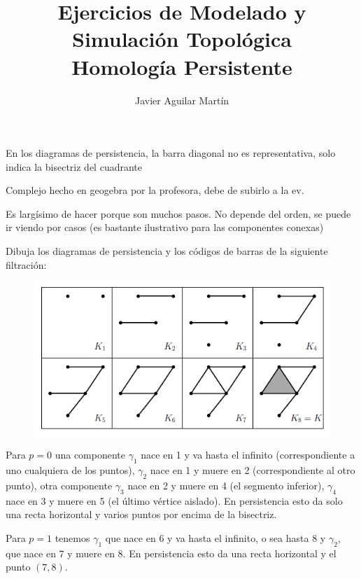 \documentclass[twoside]{article}
\begin{document}
\title{Ejercicios de Modelado y Simulación Topológica\\ Homología Persistente}
\author{Javier Aguilar Martín}
\maketitle
En los diagramas de persistencia, la barra diagonal no es representativa, solo indica la bisectriz del cuadrante
\begin{ejercicio}{4}
\end{ejercicio}
\begin{solucion}
Complejo hecho en geogebra por la profesora, debe de subirlo a la ev. 
\end{solucion}
\newpage

\begin{ejercicio}{5}
\end{ejercicio}
\begin{solucion}
Es largísimo de hacer porque son muchos pasos. No depende del orden, se puede ir viendo por casos (es bastante ilustrativo para las componentes conexas)
\end{solucion}

\newpage

\begin{ejercicio}{6}
Dibuja los diagramas de persistencia y los códigos de barras de la siguiente filtración:
\begin{figure}[h!]
\centering
\includegraphics[scale=0.8]{1-6}
\end{figure}
\end{ejercicio}
\begin{solucion}
Para $p=0$ una componente $\gamma_1$ nace en 1 y va hasta el infinito (correspondiente a uno cualquiera de los puntos), $\gamma_2$ nace en 1 y muere en 2 (correspondiente al otro punto), otra componente $\gamma_3$ nace en 2 y muere en 4 (el segmento inferior), $\gamma_4$ nace en 3 y muere en 5 (el último vértice aislado). En persistencia esto da solo una recta horizontal y varios puntos por encima de la bisectriz.

Para $p=1$ tenemos $\gamma_1$ que nace en 6 y va hasta el infinito, o sea hasta 8 y $\gamma_2$, que nace en 7 y muere en 8. En persistencia esto da una recta horizontal y el punto $(7,8)$. 
\end{solucion}
\end{document}

